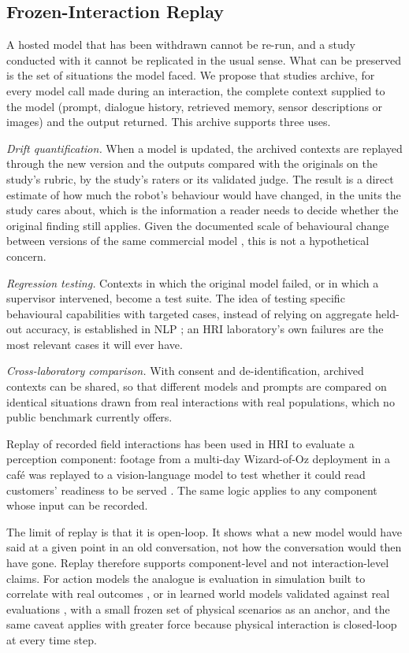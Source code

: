 \subsection{Frozen-Interaction Replay}
\label{sec:replay}

A hosted model that has been withdrawn cannot be re-run, and a study
conducted with it cannot be replicated in the usual sense. What can be
preserved is the set of situations the model faced. We propose that studies
archive, for every model call made during an interaction, the complete
context supplied to the model (prompt, dialogue history, retrieved memory,
sensor descriptions or images) and the output returned. This archive supports
three uses.

\emph{Drift quantification.} When a model is updated, the archived contexts
are replayed through the new version and the outputs compared with the
originals on the study's rubric, by the study's raters or its validated
judge. The result is a direct estimate of how much the robot's behaviour
would have changed, in the units the study cares about, which is the
information a reader needs to decide whether the original finding still
applies. Given the documented scale of behavioural change between versions of
the same commercial model \cite{chen2024how}, this is not a hypothetical
concern.

\emph{Regression testing.} Contexts in which the original model failed, or
in which a supervisor intervened, become a test suite. The idea of testing
specific behavioural capabilities with targeted cases, instead of relying on
aggregate held-out accuracy, is established in NLP \cite{ribeiro2020beyond};
an HRI laboratory's own failures are the most relevant cases it will ever
have.

\emph{Cross-laboratory comparison.} With consent and de-identification,
archived contexts can be shared, so that different models and prompts are
compared on identical situations drawn from real interactions with real
populations, which no public benchmark currently offers.

Replay of recorded field interactions has been used in HRI to evaluate a
perception component: footage from a multi-day Wizard-of-Oz deployment in a
café was replayed to a vision-language model to test whether it could read
customers' readiness to be served \cite{bu2025using}. The same logic
applies to any component whose input can be recorded.

The limit of replay is that it is open-loop. It shows what a new model would
have said at a given point in an old conversation, not how the conversation
would then have gone. Replay therefore supports component-level and not
interaction-level claims. For action models the analogue is evaluation in
simulation built to correlate with real outcomes
\cite{li2025evaluating,jain2026polaris}, or in learned world models
validated against real evaluations \cite{geminirobotics2025evaluating},
with a small frozen set of physical scenarios as an anchor, and the same
caveat applies with greater force because physical interaction is
closed-loop at every time step.

